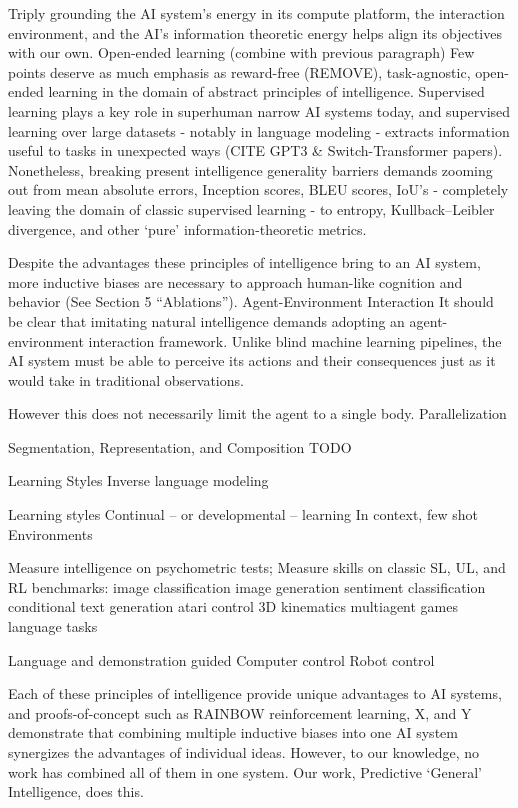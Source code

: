 \documentclass{article}
\begin{document}
Triply grounding the AI system’s energy in its compute platform, the interaction environment, and the AI's information theoretic energy helps align its objectives with our own.
Open-ended learning (combine with previous paragraph)
Few points deserve as much emphasis as reward-free (REMOVE), task-agnostic, open-ended learning in the domain of abstract principles of intelligence. Supervised learning plays a key role in superhuman narrow AI systems today, and supervised learning over large datasets - notably in language modeling - extracts information useful to tasks in unexpected ways (CITE GPT3 \& Switch-Transformer papers). Nonetheless, breaking present intelligence generality barriers demands zooming out from mean absolute errors, Inception scores, BLEU scores, IoU’s - completely leaving the domain of classic supervised learning - to entropy, Kullback–Leibler divergence, and other ‘pure’ information-theoretic metrics.

Despite the advantages these principles of intelligence bring to an AI system, more inductive biases are necessary to approach human-like cognition and behavior (See Section 5 “Ablations”).
Agent-Environment Interaction
It should be clear that imitating natural intelligence demands adopting an agent-environment interaction framework. Unlike blind machine learning pipelines, the AI system must be able to perceive its actions and their consequences just as it would take in traditional observations. 

However this does not necessarily limit the agent to a single body. Parallelization

Segmentation, Representation, and Composition
TODO

Learning Styles
Inverse language modeling

Learning styles
Continual – or developmental – learning
In context, few shot
Environments

Measure intelligence on psychometric tests; Measure skills on classic SL, UL, and RL benchmarks:
image classification
image generation
sentiment classification
conditional text generation
atari control
3D kinematics
multiagent games
language tasks

Language and demonstration guided Computer control
Robot control

Each of these principles of intelligence provide unique advantages to AI systems, and proofs-of-concept such as RAINBOW reinforcement learning, X, and Y demonstrate that combining multiple inductive biases into one AI system synergizes the advantages of individual ideas. However, to our knowledge, no work has combined all of them in one system. Our work, Predictive ‘General’ Intelligence, does this.
\end{document}
